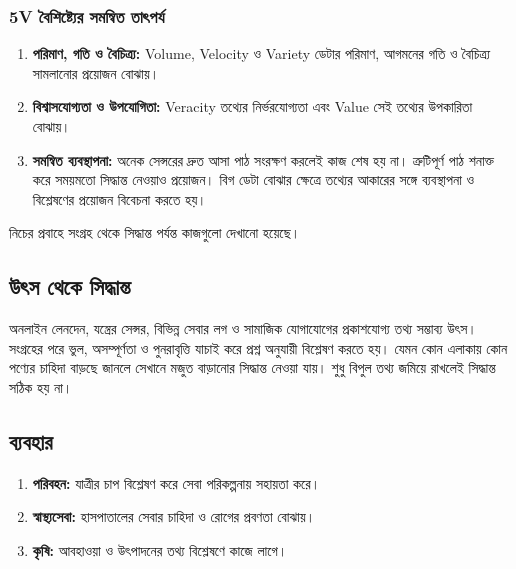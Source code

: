 \subsubsection{5V বৈশিষ্ট্যের সমন্বিত তাৎপর্য}
\begin{enumerate}
\item \textbf{পরিমাণ, গতি ও বৈচিত্র্য:} Volume, Velocity ও Variety ডেটার পরিমাণ, আগমনের গতি ও বৈচিত্র্য সামলানোর প্রয়োজন বোঝায়।
\item \textbf{বিশ্বাসযোগ্যতা ও উপযোগিতা:} Veracity তথ্যের নির্ভরযোগ্যতা এবং Value সেই তথ্যের উপকারিতা বোঝায়।
\item \textbf{সমন্বিত ব্যবস্থাপনা:} অনেক সেন্সরের দ্রুত আসা পাঠ সংরক্ষণ করলেই কাজ শেষ হয় না। ত্রুটিপূর্ণ পাঠ শনাক্ত করে সময়মতো সিদ্ধান্ত নেওয়াও প্রয়োজন। বিগ ডেটা বোঝার ক্ষেত্রে তথ্যের আকারের সঙ্গে ব্যবস্থাপনা ও বিশ্লেষণের প্রয়োজন বিবেচনা করতে হয়।
\end{enumerate}
নিচের প্রবাহে সংগ্রহ থেকে সিদ্ধান্ত পর্যন্ত কাজগুলো দেখানো হয়েছে।


\subsection{উৎস থেকে সিদ্ধান্ত}
\begin{flushleft}\centering\captionsetup{justification=centering}
\end{flushleft}
অনলাইন লেনদেন, যন্ত্রের সেন্সর, বিভিন্ন সেবার লগ ও সামাজিক যোগাযোগের প্রকাশযোগ্য তথ্য সম্ভাব্য উৎস। সংগ্রহের পরে ভুল, অসম্পূর্ণতা ও পুনরাবৃত্তি যাচাই করে প্রশ্ন অনুযায়ী বিশ্লেষণ করতে হয়। যেমন কোন এলাকায় কোন পণ্যের চাহিদা বাড়ছে জানলে সেখানে মজুত বাড়ানোর সিদ্ধান্ত নেওয়া যায়। শুধু বিপুল তথ্য জমিয়ে রাখলেই সিদ্ধান্ত সঠিক হয় না।

\subsection{ব্যবহার}
\begin{enumerate}
\item \textbf{পরিবহন:} যাত্রীর চাপ বিশ্লেষণ করে সেবা পরিকল্পনায় সহায়তা করে।
\item \textbf{স্বাস্থ্যসেবা:} হাসপাতালের সেবার চাহিদা ও রোগের প্রবণতা বোঝায়।
\item \textbf{কৃষি:} আবহাওয়া ও উৎপাদনের তথ্য বিশ্লেষণে কাজে লাগে।
\end{enumerate}
